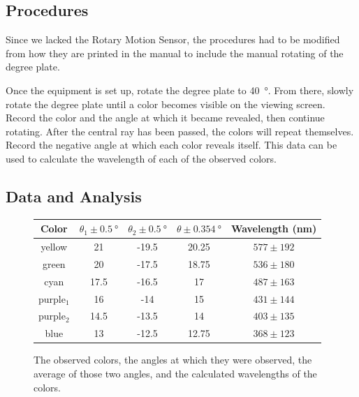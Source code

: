 \documentclass{article}
\begin{document}
\subsection{Procedures}

\qq Since we lacked the Rotary Motion Sensor, the procedures had to be modified
from how they are printed in the manual to include the manual rotating of the
degree plate. 

\qq Once the equipment is set up, rotate the degree plate to
\SI{40}{\degree}. From there, slowly rotate the degree plate until a color
becomes visible on the viewing screen. Record the color and the angle at which
it became revealed, then continue rotating. After the central ray has been
passed, the colors will repeat themselves. Record the negative angle at which
each color reveals itself. This data can be used to calculate the wavelength of
each of the observed colors.

\subsection{Data and Analysis}

\begin{figure}[H]
  \caption{The observed colors, the angles at which they were observed, the
    average of those two angles, and the calculated wavelengths of the colors.}
  \begin{center}
    \begin{tabular}{|c|c|c||c||c|}
      \hline
      Color & \(\theta_1 \pm \SI{0.5}{\degree}\) & 
      \(\theta_2 \pm \SI{0.5}{\degree}\) & \(\theta \pm \SI{0.354}{\degree}\) &
      Wavelength (\si{\nano\meter}) \\       
      \hline
      yellow       & 21   & -19.5 & 20.25 & \(577 \pm 192\) \\ 
      green        & 20   & -17.5 & 18.75 & \(536 \pm 180\) \\ 
      cyan         & 17.5 & -16.5 & 17    & \(487 \pm 163\) \\ 
      purple\(_1\) & 16   & -14   & 15    & \(431 \pm 144\) \\ 
      purple\(_2\) & 14.5 & -13.5 & 14    & \(403 \pm 135\) \\ 
      blue         & 13   & -12.5 & 12.75 & \(368 \pm 123\) \\ 
      \hline
    \end{tabular}
  \end{center}
  \label{tab:exp1data}
\end{figure}
\end{document}
